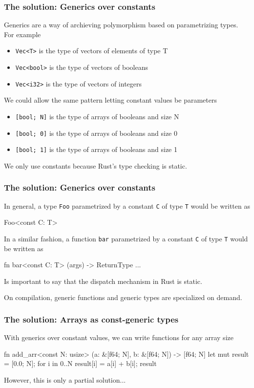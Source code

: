 \documentclass{beamer}
\newcommand{\code}[1] {\texttt{\footnotesize #1}}
\begin{document}
\begin{frame}[fragile]
    \frametitle{The solution: Generics over constants}
    Generics are a way of archieving polymorphism based on parametrizing types. For example
    \begin{itemize}
        \item \code{Vec<T>} is the type of vectors of elements of type T
        \item \code{Vec<bool>} is the type of vectors of booleans
        \item \code{Vec<i32>} is the type of vectors of integers
    \end{itemize}
    We could allow the same pattern letting constant values be parameters
    \begin{itemize}
        \item \code{[bool; N]} is the type of arrays of booleans and size N 
        \item \code{[bool; 0]} is the type of arrays of booleans and size 0 
        \item \code{[bool; 1]} is the type of arrays of booleans and size 1
    \end{itemize}
    We only use constants because Rust's type checking is static.
\end{frame}

\begin{frame}[fragile]
    \frametitle{The solution: Generics over constants}
    In general, a type \code{Foo} parametrized by a constant \code{C} of type \code{T} would be written as
    \begin{rustcode}
        Foo<const C: T>
    \end{rustcode}
    In a similar fashion, a function \code{bar} parametrized by a constant \code{C} of type \code{T} would be written as
    \begin{rustcode}
        fn bar<const C: T> (args) -> ReturnType { ... }
    \end{rustcode}
    Is important to say that the dispatch mechanism in Rust is static. 
    
    On compilation, generic functions and generic types are specialized on demand.
\end{frame}

\begin{frame}[fragile]
    \frametitle{The solution: Arrays as const-generic types}
    With generics over constant values, we can write functions for any array size
    \begin{rustcode}
    fn add_arr<const N: usize> (a: &[f64; N], b: &[f64; N]) 
    -> [f64; N] {
            let mut result = [0.0; N];
        for i in 0..N {
            result[i] = a[i] + b[i];
        }
        result
    }
    \end{rustcode}
    However, this is only a partial solution...
\end{frame}
\end{document}
